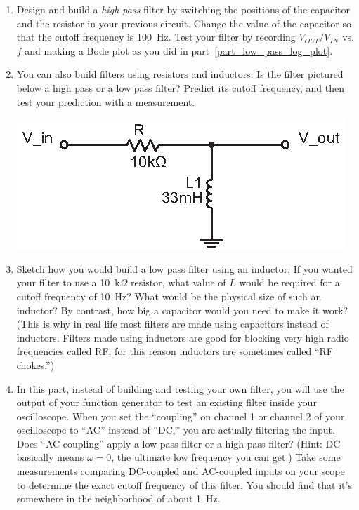 \begin{enumerate}[wide]
\item Design and build a \textit{high pass} filter by switching the positions of the capacitor and the resistor in your previous circuit.  Change the value of the capacitor so that the cutoff frequency is 100~Hz.  Test your filter by recording $V_{OUT}/V_{IN}$ vs. $f$ and making a Bode plot as you did in part~\ref{part_low_pass_log_plot}.  

\item You can also build filters using resistors and inductors.  Is the filter pictured below a high pass or a low pass filter?  Predict its cutoff frequency, and then test your prediction with a measurement.
\begin{center}
\includegraphics{filters/high_pass_filter_LR.eps}
\end{center}

\item Sketch how you would build a low pass filter using an inductor.  If you wanted your filter to use a 10~k$\Omega$ resistor, what value of $L$ would be required for a cutoff frequency of 10~Hz?  What would be the physical size of such an inductor?  By contrast, how big a capacitor would you need to make it work?  (This is why in real life most filters are made using capacitors instead of inductors.  Filters made using inductors are good for blocking very high radio frequencies called RF; for this reason inductors are sometimes called ``RF chokes.'')  

\item In this part, instead of building and testing your own filter, you will use the output of your function generator to test an existing filter inside your oscilloscope.  When you set the ``coupling'' on channel 1 or channel 2 of your oscilloscope to ``AC'' instead of ``DC,'' you are actually filtering the input.  Does ``AC coupling'' apply a low-pass filter or a high-pass filter?  (Hint: DC basically means $\omega=0$, the ultimate low frequency you can get.) Take some measurements comparing DC-coupled and AC-coupled inputs on your scope to determine the exact cutoff frequency of this filter.  You should find that it's somewhere in the neighborhood of about 1~Hz.


\end{enumerate}
